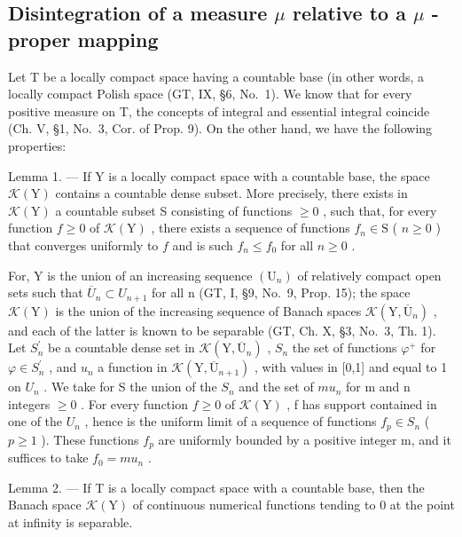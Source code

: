 \subsection{\texorpdfstring{Disintegration of a measure \(\mu\) relative to a \(\mu\) -proper mapping}{Disintegration of a measure mu relative to a mu -proper mapping}}

Let T be a locally compact space having a countable base (in other words, a locally compact Polish space (GT, IX, §6, No.~1). We know that for every positive measure on T, the concepts of integral and essential integral coincide (Ch. V, §1, No.~3, Cor. of Prop. 9). On the other hand, we have the following properties:

Lemma 1. --- If Y is a locally compact space with a countable base, the space \(\mathcal{K}(\mathrm{Y})\) contains a countable dense subset. More precisely, there exists in \(\mathcal{K}(\mathrm{Y})\) a countable subset S consisting of functions \(\geqslant 0\) , such that, for every function \(f \geqslant 0\) of \(\mathcal{K}(\mathrm{Y})\) , there exists a sequence of functions \(f_n \in \mathrm{S}\) ( \(n \geqslant 0\) ) that converges uniformly to \(f\) and is such \(f_n \leqslant f_0\) for all \(n \geqslant 0\) .

For, Y is the union of an increasing sequence \((\mathrm{U}_{n})\) of relatively compact open sets such that \(\overline{U}_{n} \subset U_{n+1}\) for all n (GT, I, §9, No.~9, Prop. 15); the space \(\mathcal{K}(\mathrm{Y})\) is the union of the increasing sequence of Banach spaces \(\mathcal{K}(\mathrm{Y}, \overline{\mathrm{U}}_{n})\) , and each of the latter is known to be separable (GT, Ch. X, §3, No.~3, Th. 1). Let \(S_{n}^{\prime}\) be a countable dense set in \(\mathcal{K}(\mathrm{Y}, \overline{\mathrm{U}}_{n})\) , \(S_{n}\) the set of functions \(\varphi^{+}\) for \(\varphi \in S_{n}^{\prime}\) , and \(u_{n}\) a function in \(\mathcal{K}(\mathrm{Y}, \overline{\mathrm{U}}_{n+1})\) , with values in {[}0,1{]} and equal to 1 on \(U_{n}\) . We take for S the union of the \(S_{n}\) and the set of \(mu_{n}\) for m and n integers \(\geqslant 0\) . For every function \(f \geqslant 0\) of \(\mathcal{K}(\mathrm{Y})\) , f has support contained in one of the \(U_{n}\) , hence is the uniform limit of a sequence of functions \(f_{p} \in S_{n}\) ( \(p \geqslant 1\) ). These functions \(f_{p}\) are uniformly bounded by a positive integer m, and it suffices to take \(f_{0} = mu_{n}\) .

Lemma 2. --- If T is a locally compact space with a countable base, then the Banach space \(\mathcal{K}(\mathrm{Y})\) of continuous numerical functions tending to 0 at the point at infinity is separable.

